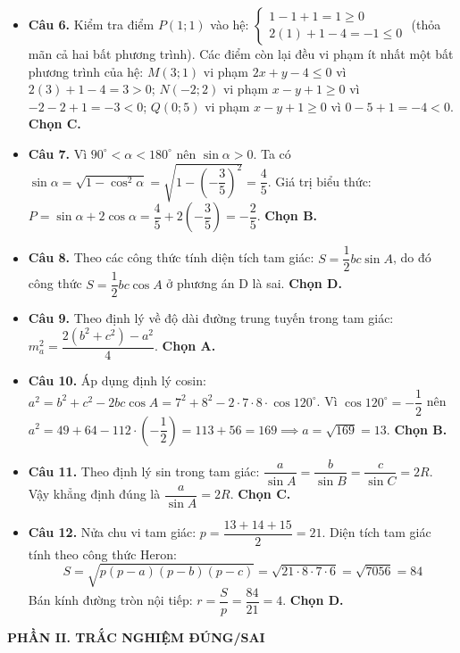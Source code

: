 \documentclass[12pt,a4paper]{article}
\begin{document}
\begin{itemize}[leftmargin=0.6cm, itemsep=4pt]
\item \textbf{Câu 6.} Kiểm tra điểm $P(1; 1)$ vào hệ:
$\begin{cases} 1 - 1 + 1 = 1 \ge 0 \\ 2(1) + 1 - 4 = -1 \le 0 \end{cases}$ (thỏa mãn cả hai bất phương trình).
Các điểm còn lại đều vi phạm ít nhất một bất phương trình của hệ:
$M(3; 1)$ vi phạm $2x + y - 4 \le 0$ vì $2(3) + 1 - 4 = 3 > 0$; $N(-2; 2)$ vi phạm $x - y + 1 \ge 0$ vì $-2 - 2 + 1 = -3 < 0$; $Q(0; 5)$ vi phạm $x - y + 1 \ge 0$ vì $0 - 5 + 1 = -4 < 0$. \textbf{Chọn C.}

\item \textbf{Câu 7.} Vì $90^\circ < \alpha < 180^\circ$ nên $\sin \alpha > 0$. Ta có $\sin \alpha = \sqrt{1 - \cos^2\alpha} = \sqrt{1 - \left(-\dfrac{3}{5}\right)^2} = \dfrac{4}{5}$.
Giá trị biểu thức: $P = \sin \alpha + 2\cos \alpha = \dfrac{4}{5} + 2\left(-\dfrac{3}{5}\right) = -\dfrac{2}{5}$. \textbf{Chọn B.}

\item \textbf{Câu 8.} Theo các công thức tính diện tích tam giác: $S = \dfrac{1}{2}bc\sin A$, do đó công thức $S = \dfrac{1}{2}bc\cos A$ ở phương án D là sai. \textbf{Chọn D.}

\item \textbf{Câu 9.} Theo định lý về độ dài đường trung tuyến trong tam giác: $m_a^2 = \dfrac{2(b^2 + c^2) - a^2}{4}$. \textbf{Chọn A.}

\item \textbf{Câu 10.} Áp dụng định lý cosin: $a^2 = b^2 + c^2 - 2bc\cos A = 7^2 + 8^2 - 2 \cdot 7 \cdot 8 \cdot \cos 120^\circ$. Vì $\cos 120^\circ = -\dfrac{1}{2}$ nên $a^2 = 49 + 64 - 112 \cdot \left(-\dfrac{1}{2}\right) = 113 + 56 = 169 \implies a = \sqrt{169} = 13$. \textbf{Chọn B.}

\item \textbf{Câu 11.} Theo định lý sin trong tam giác: $\dfrac{a}{\sin A} = \dfrac{b}{\sin B} = \dfrac{c}{\sin C} = 2R$. Vậy khẳng định đúng là $\dfrac{a}{\sin A} = 2R$. \textbf{Chọn C.}

\item \textbf{Câu 12.} Nửa chu vi tam giác: $p = \dfrac{13 + 14 + 15}{2} = 21$.
Diện tích tam giác tính theo công thức Heron:
$$S = \sqrt{p(p-a)(p-b)(p-c)} = \sqrt{21 \cdot 8 \cdot 7 \cdot 6} = \sqrt{7056} = 84$$
Bán kính đường tròn nội tiếp: $r = \dfrac{S}{p} = \dfrac{84}{21} = 4$. \textbf{Chọn D.}
\end{itemize}

\vspace{0.3cm}
\textbf{\large PHẦN II. TRẮC NGHIỆM ĐÚNG/SAI}
\end{document}
